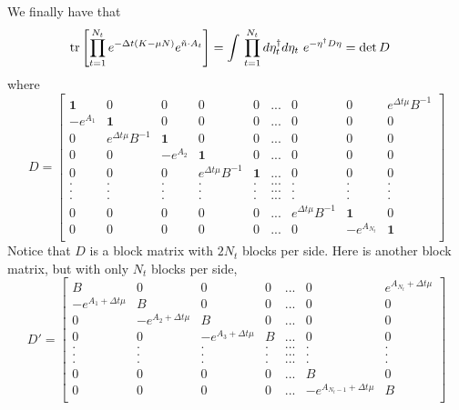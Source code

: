 We finally have that 
\begin{align*}
& \text{tr}\left[\prod_{t=1}^{N_t} e^{-\Delta t(K - \mu N)}  e^{ \tilde{n}\cdot A_t} \right]  = \int{} \prod_{t=1}^{N_t} d \eta^{\dagger}_t d\eta_t ~ e^{- \eta^{\dagger} D \eta} = \text{det} \, D
\end{align*}
where 
\begin{equation}
D = \begin{bmatrix} 
\mathbf{1} & 0 & 0 & 0 & 0 & ... & 0 & 0 & e^{\Delta t \mu} B^{-1} \\
-e^{A_1} & \mathbf{1} & 0 & 0 & 0 & ... & 0 & 0 & 0 \\
0 & e^{\Delta t \mu} B^{-1} & \mathbf{1} & 0 & 0 & ... & 0 & 0 & 0 \\
0 & 0 & -e^{A_2} & \mathbf{1} & 0 & ... & 0 & 0 & 0 \\
0 & 0 & 0 & e^{\Delta t \mu} B^{-1} & \mathbf{1} & ... & 0 & 0 & 0 \\
. & . & . & . & . & ... & . & . & . \\
. & . & . & . & . & ... & . & . & . \\
. & . & . & . & . & ... & . & . & . \\
0 & 0 & 0 & 0 & 0 & ... & e^{\Delta t \mu} B^{-1} & \mathbf{1} & 0 \\
0 & 0 & 0 & 0 & 0 & ... & 0 & -e^{A_{N_t}} & \mathbf{1} \\
\end{bmatrix}
\end{equation}
Notice that $D$ is a block matrix with $2N_t$ blocks per side. Here is another block matrix, but with only $N_t$ blocks per side,
\begin{equation}
D' = \begin{bmatrix}
B & 0 & 0 & 0 & ... & 0 & e^{A_{N_t}+ \Delta t \mu} \\
-e^{A_1+ \Delta t \mu} & B & 0 & 0 & ... & 0 & 0 \\
0 & -e^{A_2+ \Delta t \mu} & B & 0 & ... & 0 & 0 \\
0 & 0 & -e^{A_3+ \Delta t \mu} & B & ... & 0 & 0 \\
. & . & . & . & ... & . & . \\
. & . & . & . & ... & . & . \\
. & . & . & . & ... & . & . \\
0 & 0 & 0 & 0 & ... & B & 0 \\
0 & 0 & 0 & 0 & ... & -e^{A_{N_t-1}+ \Delta t \mu} & B \\
\end{bmatrix}
\end{equation} 
